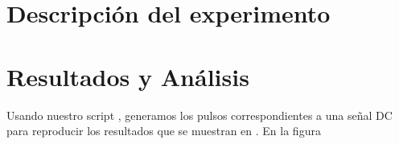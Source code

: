 \documentclass[twoside]{article}
\begin{document}
\begin{multicols}{2}
\section{Descripción del experimento}



\section{Resultados y Análisis}

Usando nuestro script \cite{script}, generamos los pulsos correspondientes a una señal DC para reproducir los resultados que se muestran en \cite{aziz1996}. En la figura 







\newpage 




\nocite{*} %

\end{multicols}
\end{document}
